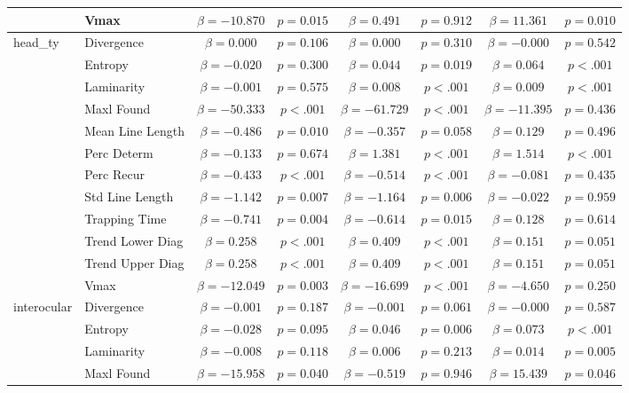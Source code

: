 \begin{tabular}{llcc|cc|cc}
 & Vmax & $\beta = -10.870$ & $p = 0.015$ & $\beta = 0.491$ & $p = 0.912$ & $\beta = 11.361$ & $p = 0.010$ \\
\midrule
\multirow{12}{*}{head_ty} & Divergence & $\beta = 0.000$ & $p = 0.106$ & $\beta = 0.000$ & $p = 0.310$ & $\beta = -0.000$ & $p = 0.542$ \\
 & Entropy & $\beta = -0.020$ & $p = 0.300$ & $\beta = 0.044$ & $p = 0.019$ & $\beta = 0.064$ & $p < .001$ \\
 & Laminarity & $\beta = -0.001$ & $p = 0.575$ & $\beta = 0.008$ & $p < .001$ & $\beta = 0.009$ & $p < .001$ \\
 & Maxl Found & $\beta = -50.333$ & $p < .001$ & $\beta = -61.729$ & $p < .001$ & $\beta = -11.395$ & $p = 0.436$ \\
 & Mean Line Length & $\beta = -0.486$ & $p = 0.010$ & $\beta = -0.357$ & $p = 0.058$ & $\beta = 0.129$ & $p = 0.496$ \\
 & Perc Determ & $\beta = -0.133$ & $p = 0.674$ & $\beta = 1.381$ & $p < .001$ & $\beta = 1.514$ & $p < .001$ \\
 & Perc Recur & $\beta = -0.433$ & $p < .001$ & $\beta = -0.514$ & $p < .001$ & $\beta = -0.081$ & $p = 0.435$ \\
 & Std Line Length & $\beta = -1.142$ & $p = 0.007$ & $\beta = -1.164$ & $p = 0.006$ & $\beta = -0.022$ & $p = 0.959$ \\
 & Trapping Time & $\beta = -0.741$ & $p = 0.004$ & $\beta = -0.614$ & $p = 0.015$ & $\beta = 0.128$ & $p = 0.614$ \\
 & Trend Lower Diag & $\beta = 0.258$ & $p < .001$ & $\beta = 0.409$ & $p < .001$ & $\beta = 0.151$ & $p = 0.051$ \\
 & Trend Upper Diag & $\beta = 0.258$ & $p < .001$ & $\beta = 0.409$ & $p < .001$ & $\beta = 0.151$ & $p = 0.051$ \\
 & Vmax & $\beta = -12.049$ & $p = 0.003$ & $\beta = -16.699$ & $p < .001$ & $\beta = -4.650$ & $p = 0.250$ \\
\midrule
\multirow{12}{*}{interocular} & Divergence & $\beta = -0.001$ & $p = 0.187$ & $\beta = -0.001$ & $p = 0.061$ & $\beta = -0.000$ & $p = 0.587$ \\
 & Entropy & $\beta = -0.028$ & $p = 0.095$ & $\beta = 0.046$ & $p = 0.006$ & $\beta = 0.073$ & $p < .001$ \\
 & Laminarity & $\beta = -0.008$ & $p = 0.118$ & $\beta = 0.006$ & $p = 0.213$ & $\beta = 0.014$ & $p = 0.005$ \\
 & Maxl Found & $\beta = -15.958$ & $p = 0.040$ & $\beta = -0.519$ & $p = 0.946$ & $\beta = 15.439$ & $p = 0.046$ \\

\end{tabular}
